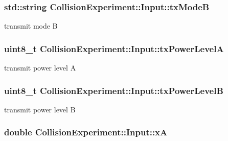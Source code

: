 \subsubsection[{\texorpdfstring{tx\+ModeB}{txModeB}}]{\setlength{\rightskip}{0pt plus 5cm}std\+::string Collision\+Experiment\+::\+Input\+::tx\+ModeB}\hypertarget{structCollisionExperiment_1_1Input_ae702c9a6f996817fed879b1c01c9afc5}{}\label{structCollisionExperiment_1_1Input_ae702c9a6f996817fed879b1c01c9afc5}


transmit mode B 

\subsubsection[{\texorpdfstring{tx\+Power\+LevelA}{txPowerLevelA}}]{\setlength{\rightskip}{0pt plus 5cm}uint8\+\_\+t Collision\+Experiment\+::\+Input\+::tx\+Power\+LevelA}\hypertarget{structCollisionExperiment_1_1Input_ac1c7cf8c05bcdf00b9d23c429b39ee7f}{}\label{structCollisionExperiment_1_1Input_ac1c7cf8c05bcdf00b9d23c429b39ee7f}


transmit power level A 

\subsubsection[{\texorpdfstring{tx\+Power\+LevelB}{txPowerLevelB}}]{\setlength{\rightskip}{0pt plus 5cm}uint8\+\_\+t Collision\+Experiment\+::\+Input\+::tx\+Power\+LevelB}\hypertarget{structCollisionExperiment_1_1Input_a1e42b824a7acbea5e22bb14c6a1c18c8}{}\label{structCollisionExperiment_1_1Input_a1e42b824a7acbea5e22bb14c6a1c18c8}


transmit power level B 

\subsubsection[{\texorpdfstring{xA}{xA}}]{\setlength{\rightskip}{0pt plus 5cm}double Collision\+Experiment\+::\+Input\+::xA}\hypertarget{structCollisionExperiment_1_1Input_a62fb772dc1b9dd7564ec0436afaf77f1}{}\label{structCollisionExperiment_1_1Input_a62fb772dc1b9dd7564ec0436afaf77f1}


